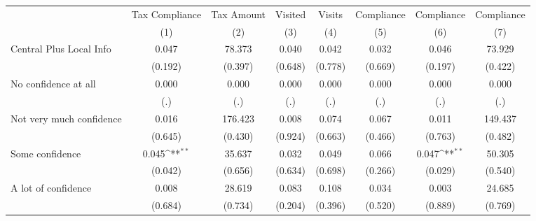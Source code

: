 {
\def\sym#1{\ifmmode^{#1}\else\(^{#1}\)\fi}
\begin{tabular}{l*{7}{c}}
\hline\hline
                &\multicolumn{1}{c}{Tax Compliance}&\multicolumn{1}{c}{Tax Amount}&\multicolumn{1}{c}{Visited}&\multicolumn{1}{c}{Visits}&\multicolumn{1}{c}{Compliance}&\multicolumn{1}{c}{Compliance}&\multicolumn{1}{c}{Compliance}\\
                &\multicolumn{1}{c}{(1)}         &\multicolumn{1}{c}{(2)}         &\multicolumn{1}{c}{(3)}         &\multicolumn{1}{c}{(4)}         &\multicolumn{1}{c}{(5)}         &\multicolumn{1}{c}{(6)}         &\multicolumn{1}{c}{(7)}         \\
\hline
Central Plus Local Info&    0.047         &   78.373         &    0.040         &    0.042         &    0.032         &    0.046         &   73.929         \\
                &  (0.192)         &  (0.397)         &  (0.648)         &  (0.778)         &  (0.669)         &  (0.197)         &  (0.422)         \\
No confidence at all&    0.000         &    0.000         &    0.000         &    0.000         &    0.000         &    0.000         &    0.000         \\
                &      (.)         &      (.)         &      (.)         &      (.)         &      (.)         &      (.)         &      (.)         \\
Not very much confidence&    0.016         &  176.423         &    0.008         &    0.074         &    0.067         &    0.011         &  149.437         \\
                &  (0.645)         &  (0.430)         &  (0.924)         &  (0.663)         &  (0.466)         &  (0.763)         &  (0.482)         \\
Some confidence &    0.045\sym{**} &   35.637         &    0.032         &    0.049         &    0.066         &    0.047\sym{**} &   50.305         \\
                &  (0.042)         &  (0.656)         &  (0.634)         &  (0.698)         &  (0.266)         &  (0.029)         &  (0.540)         \\
A lot of confidence&    0.008         &   28.619         &    0.083         &    0.108         &    0.034         &    0.003         &   24.685         \\
                &  (0.684)         &  (0.734)         &  (0.204)         &  (0.396)         &  (0.520)         &  (0.889)         &  (0.769)         \\

\end{tabular}}
